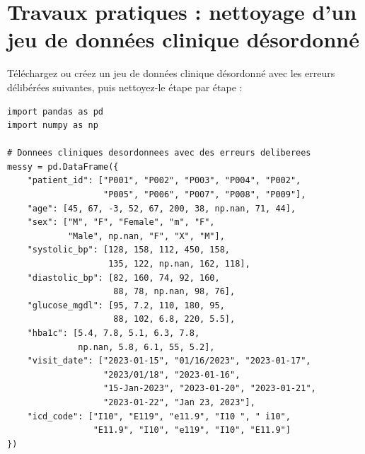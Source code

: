 \section{Travaux pratiques : nettoyage d'un jeu de donn\'ees clinique d\'esordonn\'e}

\begin{exercise}
T\'el\'echargez ou cr\'eez un jeu de donn\'ees clinique d\'esordonn\'e avec les erreurs d\'elib\'er\'ees suivantes, puis nettoyez-le \'etape par \'etape :

\begin{verbatim}
import pandas as pd
import numpy as np

# Donnees cliniques desordonnees avec des erreurs deliberees
messy = pd.DataFrame({
    "patient_id": ["P001", "P002", "P003", "P004", "P002",
                   "P005", "P006", "P007", "P008", "P009"],
    "age": [45, 67, -3, 52, 67, 200, 38, np.nan, 71, 44],
    "sex": ["M", "F", "Female", "m", "F",
            "Male", np.nan, "F", "X", "M"],
    "systolic_bp": [128, 158, 112, 450, 158,
                    135, 122, np.nan, 162, 118],
    "diastolic_bp": [82, 160, 74, 92, 160,
                     88, 78, np.nan, 98, 76],
    "glucose_mgdl": [95, 7.2, 110, 180, 95,
                     88, 102, 6.8, 220, 5.5],
    "hba1c": [5.4, 7.8, 5.1, 6.3, 7.8,
              np.nan, 5.8, 6.1, 55, 5.2],
    "visit_date": ["2023-01-15", "01/16/2023", "2023-01-17",
                   "2023/01/18", "2023-01-16",
                   "15-Jan-2023", "2023-01-20", "2023-01-21",
                   "2023-01-22", "Jan 23, 2023"],
    "icd_code": ["I10", "E119", "e11.9", "I10 ", " i10",
                 "E11.9", "I10", "e119", "I10", "E11.9"]
})
\end{verbatim}


\end{exercise}
